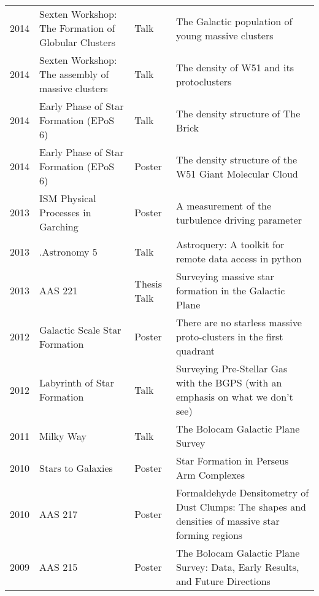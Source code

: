 \begin{tabular}{cp{1.8in}p{1.5cm}p{3.0in}}
    2014 &      Sexten Workshop: The Formation of Globular Clusters  & Talk & The Galactic population of young massive clusters \\
    2014 &      Sexten Workshop: The assembly of massive clusters  & Talk & The density of W51 and its protoclusters \\
    2014 &      Early Phase of Star Formation (EPoS 6)  & Talk & The density structure of The Brick \\
    2014 &      Early Phase of Star Formation (EPoS 6)  & Poster & The density structure of the W51 Giant Molecular Cloud \\
    2013 &      ISM Physical Processes in Garching  & Poster & A measurement of the turbulence driving parameter \\
    2013 &      .Astronomy 5  & Talk & Astroquery: A toolkit for remote data access in python \\
    2013 &      AAS 221  & Thesis Talk & Surveying massive star formation in the Galactic Plane \\
    2012 &      Galactic Scale Star Formation  & Poster& There are no starless massive proto-clusters in the first quadrant \\
    2012 &      Labyrinth of Star Formation  &  Talk& Surveying Pre-Stellar Gas with the BGPS (with an emphasis on what we don't see) \\
    2011 &      Milky Way  & Talk& The Bolocam Galactic Plane Survey \\
    2010 &      Stars to Galaxies  & Poster& Star Formation in Perseus Arm Complexes \\
    2010 &      AAS 217  &  Poster& Formaldehyde Densitometry of Dust Clumps: The shapes and densities of massive star forming regions \\
    2009 &      AAS 215  &  Poster& The Bolocam Galactic Plane Survey: Data, Early Results, and Future Directions \\
\end{tabular}


